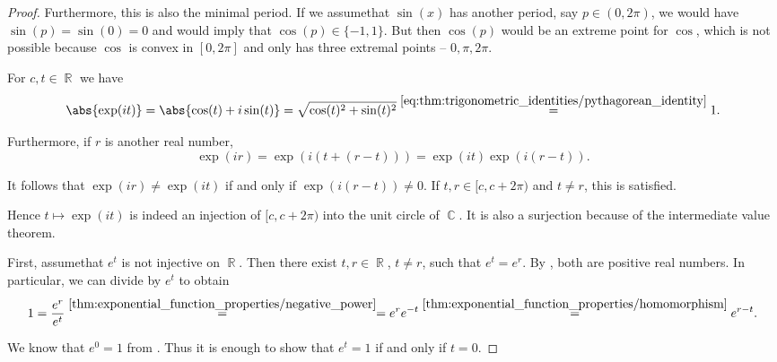 \begin{proof}
  Furthermore, this is also the minimal period. If we assume\LEM that \( \sin(x) \) has another period, say \( p \in (0, 2\pi) \), we would have \( \sin(p) = \sin(0) = 0 \) and  would imply that \( \cos(p) \in \{ -1, 1 \} \). But then \( \cos(p) \) would be an extreme point for \( \cos \), which is not possible because \( \cos \) is convex in \( [0, 2\pi] \) and only has three extremal points -- \( 0, \pi, 2\pi \).

   For \( c, t \in \BbbR \) we have
  \begin{equation*}
    \abs{\exp(it)}
    =
    \abs{\cos(t) + i\sin(t)}
    =
    \sqrt{\cos(t)^2 + \sin(t)^2}
    \overset {\eqref{eq:thm:trigonometric_identities/pythagorean_identity}} =
    1.
  \end{equation*}

  Furthermore, if \( r \) is another real number,
  \begin{equation}
    \exp(ir)
    =
    \exp(i(t + (r - t)))
    =
    \exp(it) \exp(i(r - t)).
  \end{equation}

  It follows that \( \exp(ir) \neq \exp(it) \) if and only if \( \exp(i(r - t)) \neq 0 \). If \( t, r \in [c, c + 2\pi) \) and \( t \neq r \), this is satisfied.

  Hence \( t \mapsto \exp(it) \) is indeed an injection of \( [c, c + 2\pi) \) into the unit circle of \( \BbbC \). It is also a surjection because of the intermediate value theorem.

   First, assume\LEM that \( e^t \) is not injective on \( \BbbR \). Then there exist \( t, r \in \BbbR \), \( t \neq r \), such that \( e^t = e^r \). By , both are positive real numbers. In particular, we can divide by \( e^t \) to obtain
  \begin{equation*}
    1
    =
    \frac {e^r} {e^t}
    \overset {\ref{thm:exponential_function_properties/negative_power}} =
    =
    e^r e^{-t}
    \overset {\ref{thm:exponential_function_properties/homomorphism}} =
    e^{r - t}.
  \end{equation*}

  We know that \( e^0 = 1 \) from . Thus it is enough to show that \( e^t = 1 \) if and only if \( t = 0 \).


\end{proof}
